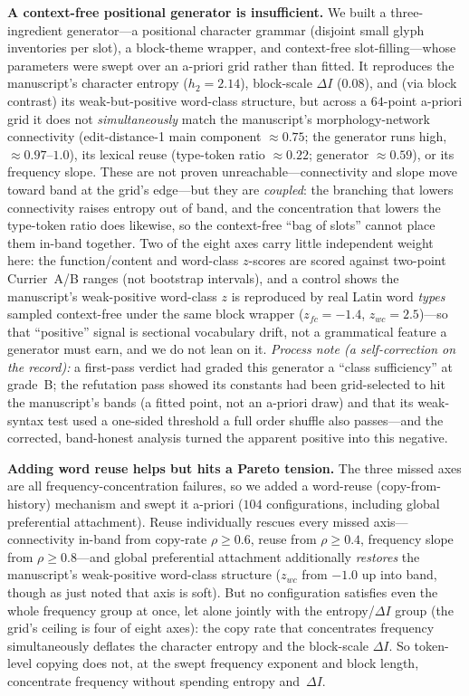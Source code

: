 \documentclass[11pt]{article}
\begin{document}
\textbf{A context-free positional generator is insufficient.} We built a three-ingredient
generator---a positional character grammar (disjoint small glyph inventories per slot), a
block-theme wrapper, and context-free slot-filling---whose parameters were swept over an
a-priori grid rather than fitted. It reproduces the manuscript's character entropy
($h_2=2.14$), block-scale $\Delta I$ ($0.08$), and (via block contrast) its
weak-but-positive word-class structure, but across a $64$-point a-priori grid it does not
\emph{simultaneously} match the manuscript's morphology-network connectivity
(edit-distance-1 main component $\approx 0.75$; the generator runs high, $\approx
0.97$--$1.0$), its lexical reuse (type-token ratio $\approx 0.22$; generator $\approx
0.59$), or its frequency slope. These are not proven unreachable---connectivity and slope
move toward band at the grid's edge---but they are \emph{coupled}: the branching that
lowers connectivity raises entropy out of band, and the concentration that lowers the
type-token ratio does likewise, so the context-free ``bag of slots'' cannot place them
in-band together. Two of the eight axes carry little independent weight here: the
function/content and word-class $z$-scores are scored against two-point Currier~A/B ranges
(not bootstrap intervals), and a control shows the manuscript's weak-positive word-class
$z$ is reproduced by real Latin word \emph{types} sampled context-free under the same
block wrapper ($z_{fc}=-1.4$, $z_{wc}=2.5$)---so that ``positive'' signal is sectional
vocabulary drift, not a grammatical feature a generator must earn, and we do not lean on
it. \emph{Process note (a self-correction on the record):} a first-pass verdict had
graded this generator a ``class sufficiency'' at grade~B; the refutation pass showed its
constants had been grid-selected to hit the manuscript's bands (a fitted point, not an
a-priori draw) and that its weak-syntax test used a one-sided threshold a full order
shuffle also passes---and the corrected, band-honest analysis turned the apparent
positive into this negative.

\textbf{Adding word reuse helps but hits a Pareto tension.} The three missed axes are all
frequency-concentration failures, so we added a word-reuse (copy-from-history) mechanism
and swept it a-priori ($104$ configurations, including global preferential attachment).
Reuse individually rescues every missed axis---connectivity in-band from copy-rate
$\rho\geq 0.6$, reuse from $\rho\geq 0.4$, frequency slope from $\rho\geq 0.8$---and
global preferential attachment additionally \emph{restores} the manuscript's weak-positive
word-class structure ($z_{wc}$ from $-1.0$ up into band, though as just noted that axis is
soft). But no configuration satisfies even the whole frequency group at once, let alone
jointly with the entropy/$\Delta I$ group (the grid's ceiling is four of eight axes): the
copy rate that concentrates frequency simultaneously deflates the character entropy and
the block-scale $\Delta I$. So token-level copying does not, at the swept frequency
exponent and block length, concentrate frequency without spending entropy and~$\Delta I$.
\end{document}
